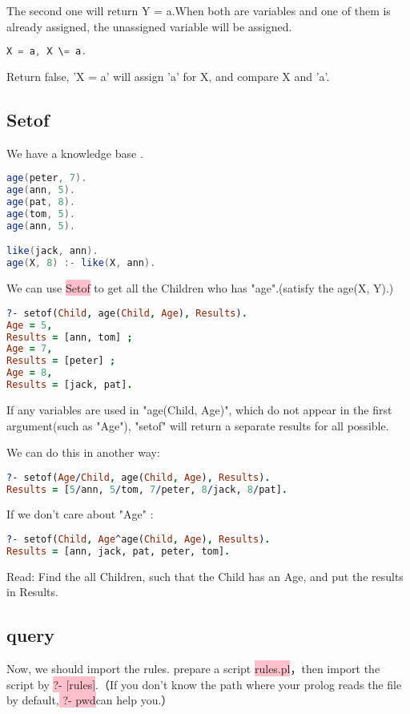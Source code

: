 \documentclass[a4paper, 11pt]{article}
\begin{document}
The second one will return Y = a.When both are variables and one of them is already assigned, the unassigned variable will be assigned.

\begin{lstlisting}[language={java}]
X = a, X \= a.
\end{lstlisting}

Return false, 'X = a' will assign 'a' for X, and compare X and 'a'.

\subsection{Setof}
We have a knowledge base .

\begin{lstlisting}[language={java}]
age(peter, 7).
age(ann, 5).
age(pat, 8).
age(tom, 5).
age(ann, 5).

like(jack, ann).
age(X, 8) :- like(X, ann).
\end{lstlisting}

We can use \colorbox{pink}{\color{black} Setof} to get all the Children who has "age".(satisfy the age(X, Y).)
\begin{lstlisting}[language={prolog}]
?- setof(Child, age(Child, Age), Results).
Age = 5,
Results = [ann, tom] ;
Age = 7,
Results = [peter] ;
Age = 8,
Results = [jack, pat].
\end{lstlisting}

If any variables are used in "age(Child, Age)", which do not appear in the first argument(such as "Age"), "setof" will return a separate results for all possible.

We can do this in another way:
\begin{lstlisting}[language={prolog}]
?- setof(Age/Child, age(Child, Age), Results).
Results = [5/ann, 5/tom, 7/peter, 8/jack, 8/pat].
\end{lstlisting}

If we don't care about "Age" :
\begin{lstlisting}[language={prolog}]
?- setof(Child, Age^age(Child, Age), Results).
Results = [ann, jack, pat, peter, tom].
\end{lstlisting}

 Read: Find the all Children, such that the Child has an Age, and put the results in Results. 


\subsection{query}
Now, we should import the rules.
prepare a script \colorbox{pink}{\color{black} rules.pl}，then import the script by \colorbox{pink}{\color{black} ?- [rules]}.（If you don’t know the path where your prolog reads the file by default,\colorbox{pink}{\color{black} ?- pwd}can help you.）
\end{document}
